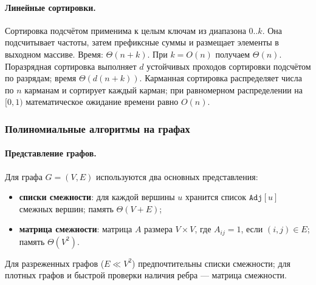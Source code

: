 \documentclass[a4paper,12pt]{article}
\begin{document}
\paragraph*{Линейные сортировки.}
Сортировка подсчётом применима к целым ключам из диапазона \(0..k\). Она подсчитывает частоты, затем префиксные суммы и размещает элементы в выходном массиве. Время: \(\Theta(n+k)\). При \(k=O(n)\) получаем \(\Theta(n)\). Поразрядная сортировка выполняет \(d\) устойчивых проходов сортировки подсчётом по разрядам; время \(\Theta(d(n+k))\). Карманная сортировка распределяет числа по \(n\) карманам и сортирует каждый карман; при равномерном распределении на \([0,1)\) математическое ожидание времени равно \(O(n)\).

\subsubsection*{Полиномиальные алгоритмы на графах}

\paragraph*{Представление графов.}
Для графа \(G=(V,E)\) используются два основных представления:
\begin{itemize}
    \item \textbf{списки смежности}: для каждой вершины \(u\) хранится список \(\texttt{Adj}[u]\) смежных вершин; память \(\Theta(V+E)\);
    \item \textbf{матрица смежности}: матрица \(A\) размера \(V\times V\), где \(A_{ij}=1\), если \((i,j)\in E\); память \(\Theta(V^2)\).
\end{itemize}
Для разреженных графов (\(E\ll V^2\)) предпочтительны списки смежности; для плотных графов и быстрой проверки наличия ребра — матрица смежности.
\end{document}
